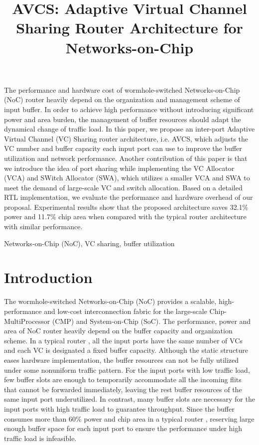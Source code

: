 \documentclass[paper]{ieice}
\title{AVCS: Adaptive Virtual Channel Sharing Router Architecture for Networks-on-Chip}
\begin{document}
\maketitle
\begin{summary}
The performance and hardware cost of wormhole-switched Networks-on-Chip (NoC) router heavily depend on the organization and management scheme of input buffer. In order to achieve high performance without introducing significant power and area burden, the management of buffer resources should adapt the dynamical change of traffic load. In this paper, we propose an inter-port Adaptive Virtual Channel (VC) Sharing router architecture, i.e. AVCS, which adjusts the VC number and buffer capacity each input port can use to improve the buffer utilization and network performance. Another contribution of this paper is that we introduce the idea of port sharing while implementing the VC Allocator (VCA) and SWitch Allocator (SWA), which utilizes a smaller VCA and SWA to meet the demand of large-scale VC and switch allocation. Based on a detailed RTL implementation, we evaluate the performance and hardware overhead of our proposal. Experimental results show that the proposed architecture saves 32.1\% power and 11.7\% chip area when compared with the typical router architecture with similar performance.
\end{summary}
\begin{keywords}
Networks-on-Chip (NoC), VC sharing, buffer utilization
\end{keywords}

\section{Introduction}
The wormhole-switched Networks-on-Chip (NoC) provides a scalable, high-performance and low-cost interconnection fabric for the large-scale Chip-MultiProcessor (CMP) and System-on-Chip (SoC). The performance, power and area of NoC router heavily depend on the buffer capacity and organization scheme. In a typical router \cite{DaTo01}, all the input ports have the same number of VCs and each VC is designated a fixed buffer capacity. Although the static structure eases hardware implementation, the buffer resources can not be fully utilized under some nonuniform traffic pattern. For the input ports with low traffic load, few buffer slots are enough to temporarily accommodate all the incoming flits that cannot be forwarded immediately, leaving the rest buffer resources of the same input port underutilized. In contrast, many buffer slots are necessary for the input ports with high traffic load to guarantee throughput. Since the buffer consumes more than 60\% power and chip area in a typical router \cite{1650108}\cite{ChPe03}, reserving large enough buffer space for each input port to ensure the performance under high traffic load is infeasible.
\end{document}
